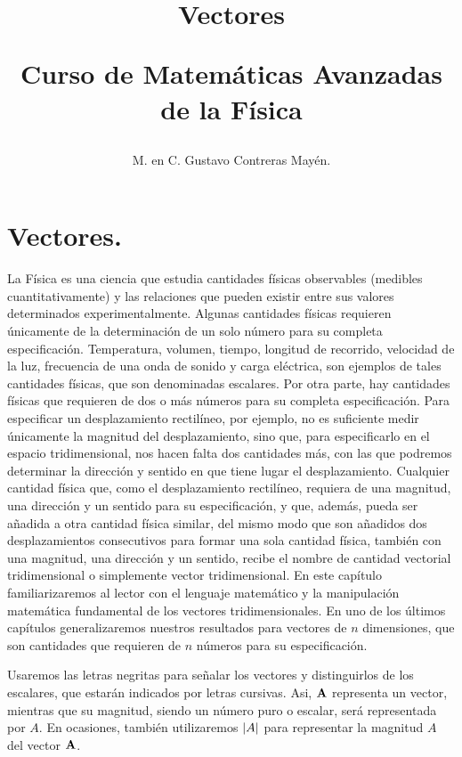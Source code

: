 \documentclass[12pt]{article}
\title{Vectores \\ \begin{Large} Curso de Matemáticas Avanzadas de la Física \end{Large}}
\author{M. en C. Gustavo Contreras Mayén.}
\date{ }
\begin{document}
\maketitle
\fontsize{14}{14}\selectfont

\tableofcontents

\newpage

\section{Vectores.}

La Física es una ciencia que estudia cantidades físicas observables (medibles cuantitativamente) y las relaciones que pueden existir entre sus valores determinados experimentalmente. Algunas cantidades físicas requieren únicamente de la determinación de un solo número para su completa especificación. Temperatura, volumen, tiempo, longitud de recorrido, velocidad de la luz, frecuencia de una onda de sonido y carga eléctrica, son ejemplos de tales cantidades físicas, que son denominadas escalares. Por otra parte, hay cantidades físicas que requieren de dos o más números para su completa especificación. Para especificar un desplazamiento rectilíneo, por ejemplo, no es suficiente medir únicamente la magnitud del desplazamiento, sino que, para especificarlo en el espacio tridimensional, nos hacen falta dos cantidades más, con las que podremos determinar la dirección y sentido en que tiene lugar el desplazamiento. Cualquier cantidad física que, como el desplazamiento rectilíneo, requiera de una magnitud, una dirección y un sentido para su especificación, y que, además, pueda ser añadida a otra cantidad física similar, del mismo modo que son añadidos dos 
desplazamientos consecutivos para formar una sola cantidad física, también con una magnitud, una dirección y un sentido, recibe el nombre de cantidad vectorial tridimensional o simplemente vector tridimensional. En este capítulo familiarizaremos al lector con el lenguaje matemático y la manipulación matemática fundamental de los vectores tridimensionales. En uno de los últimos capítulos generalizaremos nuestros resultados para vectores de $n$ dimensiones, que son cantidades que requieren de $n$ números para su especificación. 
\par
Usaremos las letras negritas para señalar los vectores y distinguirlos de los escalares, que estarán indicados por letras cursivas. Asi, $\vb{A}$ representa un vector, mientras que su magnitud, siendo un número puro o escalar, será representada por $A$. En ocasiones, también utilizaremos $\abs{A}$ para representar la magnitud $A$ del vector $\vb{A}$.
\end{document}
